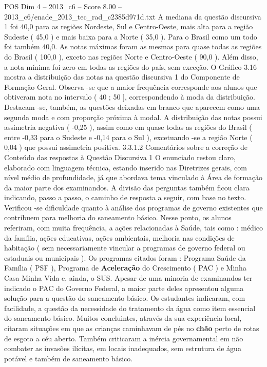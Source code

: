 \begin{textsample}{POS Dim 4 – 2013\_c6 – Score 8.00 – 2013\_c6/enade\_2013\_tec\_rad\_c2385d971d.txt}
A mediana da questão discursiva 1 foi 40,0 para as regiões Nordeste, Sul e Centro-Oeste, mais alta para a região Sudeste ( 45,0 ) e mais baixa para a Norte ( 35,0 ).
Para o Brasil como um todo foi também 40,0.
As notas máximas foram as mesmas para quase todas as regiões do Brasil ( 100,0 ), exceto nas regiões Norte e Centro-Oeste ( 90,0 ).
Além disso, a nota mínima foi zero em todas as regiões do país, sem exceção.
O Gráfico 3.16 mostra a distribuição das notas na questão discursiva 1 do Componente de Formação Geral.
Observa -se que a maior frequência corresponde aos alunos que obtiveram nota no intervalo ( 40 ; 50 ], correspondendo à moda da distribuição.
Destacam -se, também, as questões deixadas em branco que aparecem como uma segunda moda e com proporção próxima à modal.
A distribuição das notas possui assimetria negativa ( -0,25 ), assim como em quase todas as regiões do Brasil ( entre -0,33 para o Sudeste e -0,14 para o Sul ), excetuando -se a região Norte ( 0,04 ) que possui assimetria positiva. 3.3.1.2 Comentários sobre a correção de Conteúdo das respostas à Questão Discursiva 1 O enunciado restou claro, elaborado com linguagem técnica, estando inserido nas Diretrizes gerais, com nível médio de profundidade, já que abordava tema vinculado à Área de formação da maior parte dos examinandos.
A divisão das perguntas também ficou clara indicando, passo a passo, o caminho de resposta a seguir, com base no texto.
Verificou -se dificuldade quanto à análise dos programas de governo existentes que contribuem para melhoria do saneamento básico.
Nesse ponto, os alunos referiram, com muita frequência, a ações relacionadas à Saúde, tais como : médico da família, ações educativas, ações ambientais, melhoria nas condições de habitação ( sem necessariamente vincular a programas de governo federal ou estaduais ou municipais ).
Os programas citados foram : Programa Saúde da Família ( PSF ), Programa de \textbf{Aceleração} do Crescimento ( PAC ) e Minha Casa Minha Vida e, ainda, o SUS.
Apesar de uma minoria de examinandos ter indicado o PAC do Governo Federal, a maior parte deles apresentou alguma solução para a questão do saneamento básico.
Os estudantes indicaram, com facilidade, a questão da necessidade do tratamento da água como item essencial do saneamento básico.
Muitos concluintes, através da sua experiência local, citaram situações em que as crianças caminhavam de pés no \textbf{chão} perto de rotas de esgoto a céu aberto.
Também criticaram a inércia governamental em não combater as invasões ilícitas, em locais inadequados, sem estrutura de água potável e também de saneamento básico.

\end{textsample}
